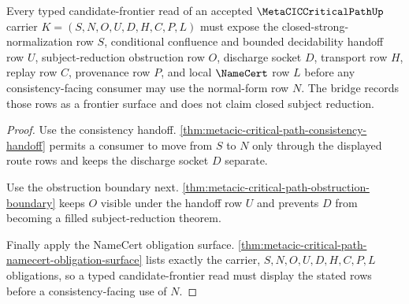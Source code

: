 \begin{theorem}
\label{thm:metacic-critical-path-typed-candidate-frontier-bridge}
Every typed candidate-frontier read of an accepted $\MetaCICCriticalPathUp$ carrier $K=(S,N,O,U,D,H,C,P,L)$ must expose the closed-strong-normalization row $S$, conditional confluence and bounded decidability handoff row $U$, subject-reduction obstruction row $O$, discharge socket $D$, transport row $H$, replay row $C$, provenance row $P$, and local $\NameCert$ row $L$ before any consistency-facing consumer may use the normal-form row $N$. The bridge records those rows as a frontier surface and does not claim closed subject reduction.
\end{theorem}
\begin{proof}
Use the consistency handoff. \autoref{thm:metacic-critical-path-consistency-handoff} permits a consumer to move from $S$ to $N$ only through the displayed route rows and keeps the discharge socket $D$ separate.

Use the obstruction boundary next. \autoref{thm:metacic-critical-path-obstruction-boundary} keeps $O$ visible under the handoff row $U$ and prevents $D$ from becoming a filled subject-reduction theorem.

Finally apply the NameCert obligation surface. \autoref{thm:metacic-critical-path-namecert-obligation-surface} lists exactly the carrier, $S,N,O,U,D,H,C,P,L$ obligations, so a typed candidate-frontier read must display the stated rows before a consistency-facing use of $N$.
\end{proof}

